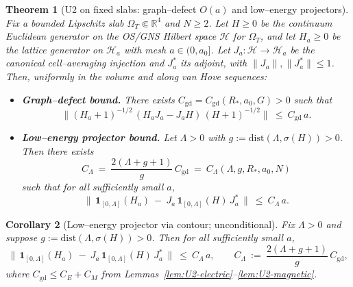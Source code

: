 \documentclass[11pt]{amsart}
\theoremstyle{plain}
\newtheorem{theorem}{Theorem}[section]
\newtheorem{corollary}[theorem]{Corollary}
\theoremstyle{definition}
\theoremstyle{remark}
\begin{document}
\begin{theorem}[U2 on fixed slabs: graph--defect $O(a)$ and low--energy projectors]\label{thm:U2}
Fix a bounded Lipschitz slab $\Omega_T\Subset\mathbb R^4$ and $N\ge 2$. Let $H\ge 0$ be the continuum Euclidean generator on the OS/GNS Hilbert space $\mathcal H$ for $\Omega_T$, and let $H_a\ge 0$ be the lattice generator on $\mathcal H_a$ with mesh $a\in(0,a_0]$. Let $J_a:\mathcal H\to\mathcal H_a$ be the canonical cell--averaging injection and $J_a^*$ its adjoint, with $\|J_a\|,\|J_a^*\|\le 1$. Then, uniformly in the volume and along van Hove sequences:
\begin{itemize}
  \item[(A)] \textbf{Graph--defect bound.} There exists $C_{\mathrm{gd}}=C_{\mathrm{gd}}(R_*,a_0,G)>0$ such that
  \[
    \big\|(H_a+1)^{-1/2}\,(H_a J_a - J_a H)\,(H+1)^{-1/2}\big\|\ \le\ C_{\mathrm{gd}}\, a.
  \]
  \item[(B)] \textbf{Low--energy projector bound.} Let $\Lambda>0$ with $g:=\mathrm{dist}(\Lambda,\sigma(H))>0$. Then there exists
  \[
    C_\Lambda\ =\ \frac{2(\Lambda+g+1)}{g}\, C_{\mathrm{gd}}\ =\ C_\Lambda(\Lambda,g,R_*,a_0,N)
  \]
  such that for all sufficiently small $a$,
  \[
    \big\|\,\mathbf 1_{[0,\Lambda]}(H_a)\ -\ J_a\,\mathbf 1_{[0,\Lambda]}(H)\,J_a^*\,\big\|\ \le\ C_\Lambda\, a.
  \]
\end{itemize}
\end{theorem}

\begin{corollary}[Low--energy projector via contour; unconditional]\label{lem:low-energy-proj}
Fix $\Lambda>0$ and suppose $g:=\mathrm{dist}(\Lambda,\sigma(H))>0$. Then for all sufficiently small $a$,
\[
  \big\|\,\mathbf 1_{[0,\Lambda]}(H_a)\ -\ J_a\,\mathbf 1_{[0,\Lambda]}(H)\,J_a^*\,\big\|\ \le\ C_\Lambda\, a,\qquad C_\Lambda\ :=\ \frac{2(\Lambda+g+1)}{g}\, C_{\mathrm{gd}},
\]
where $C_{\mathrm{gd}}\le C_E+C_M$ from Lemmas~\ref{lem:U2-electric}--\ref{lem:U2-magnetic}.
\end{corollary}
\end{document}
